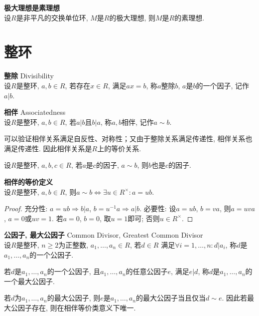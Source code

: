 \begin{col} \textbf{极大理想是素理想}\\
设$R$是非平凡的交换单位环, $M$是$R$的极大理想, 则$M$是$R$的素理想. 
\end{col}

\section{整环}



\begin{dfn} \textbf{整除} Divisibility \\
设$R$是整环, $a,b\in R$, 若存在$x\in R$, 满足$ax=b$, 称$a$整除$b$, $a$是$b$的一个因子, 记作$a|b$. 
\end{dfn}

\begin{dfn} \textbf{相伴} Associatedness\\
设$R$是整环, $a,b\in R$, 若$a|b$且$b|a$, 称$a,b$相伴, 记作$a\sim b$. 
\end{dfn}
可以验证相伴关系满足自反性、对称性；又由于整除关系满足传递性, 相伴关系也满足传递性. 因此相伴关系是$R$上的等价关系. 

设$R$是整环, $a,b,c\in R$, 若$a$是$c$的因子, $a\sim b$, 则$b$也是$c$的因子. 

\begin{pro}\textbf{相伴的等价定义}\\
设$R$是整环, $a,b\in R$, 则$a\sim b\iff \exists u\in R^\times: a=ub$. 
\end{pro}
\begin{proof}
充分性: $a=ub \Rightarrow b|a$, $b=u^{-1}a \Rightarrow a|b$. 必要性: 设$a=ub$, $b=va$, 则$a=uva$, $a=0$或$uv=1$. 若$a=0$, $b=0$, 取$u=1$即可; 否则$u\in R^\times$. 
\end{proof}

\begin{dfn} \textbf{公因子, 最大公因子} Common Divisor, Greatest Common Divisor \\
设$R$是整环, $n\ge 2$为正整数, $a_1,\dots,a_n\in R$, 若$d\in R$ 满足$\forall i=1,\dots,n: d|a_i$, 称$d$是$a_1,\dots,a_n$的一个公因子. 

若$d$是$a_1,\dots,a_n$的一个公因子, 且$a_1,\dots,a_n$的任意公因子$e$, 满足$e|d$, 称$d$是$a_1,\dots,a_n$的一个最大公因子. 
\end{dfn}

若$d$为$a_1,\dots,a_n$的最大公因子, 则$e$是$a_1,\dots,a_n$的最大公因子当且仅当$d\sim e$. 因此若最大公因子存在, 则在相伴等价类意义下唯一. 

